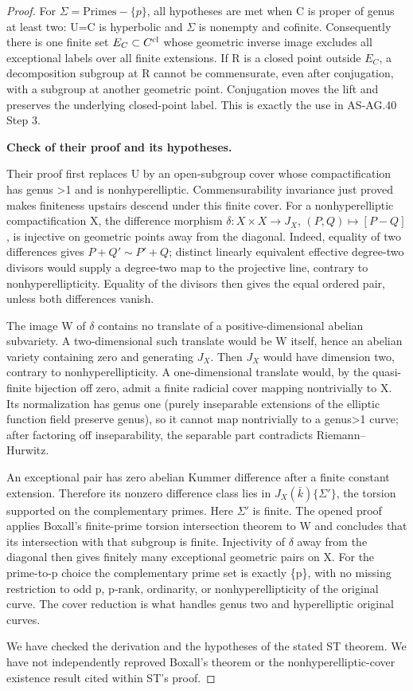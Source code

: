 \begin{proof}
For \({\Sigma}=\mathrm{Primes}-\{p\}\), all hypotheses are met when C is proper of genus at least two: U=C is hyperbolic and \({\Sigma}\) is nonempty and cofinite. Consequently there is one finite set \(E_C\subset C^{\rm cl}\) whose geometric inverse image excludes all exceptional labels over all finite extensions. If R is a closed point outside \(E_C\), a decomposition subgroup at R cannot be commensurate, even after conjugation, with a subgroup at another geometric point. Conjugation moves the lift and preserves the underlying closed-point label. This is exactly the use in AS-AG.40 Step 3.

\textbf{Check of their proof and its hypotheses.}

Their proof first replaces U by an open-subgroup cover whose compactification has genus \textgreater1 and is nonhyperelliptic. Commensurability invariance just proved makes finiteness upstairs descend under this finite cover. For a nonhyperelliptic compactification X, the difference morphism \(\delta:X\times X\to J_X\), \((P,Q)\mapsto[P-Q]\), is injective on geometric points away from the diagonal. Indeed, equality of two differences gives \(P+Q'\sim P'+Q\); distinct linearly equivalent effective degree-two divisors would supply a degree-two map to the projective line, contrary to nonhyperellipticity. Equality of the divisors then gives the equal ordered pair, unless both differences vanish.

The image W of \({\delta}\) contains no translate of a positive-dimensional abelian subvariety. A two-dimensional such translate would be W itself, hence an abelian variety containing zero and generating \(J_X\). Then \(J_X\) would have dimension two, contrary to nonhyperellipticity. A one-dimensional translate would, by the quasi-finite bijection off zero, admit a finite radicial cover mapping nontrivially to X. Its normalization has genus one (purely inseparable extensions of the elliptic function field preserve genus), so it cannot map nontrivially to a genus\textgreater1 curve; after factoring off inseparability, the separable part contradicts Riemann--Hurwitz.

An exceptional pair has zero abelian Kummer difference after a finite constant extension. Therefore its nonzero difference class lies in \(J_X(\bar k)\{\Sigma'\}\), the torsion supported on the complementary primes. Here \({\Sigma}'\) is finite. The opened proof applies Boxall's finite-prime torsion intersection theorem to W and concludes that its intersection with that subgroup is finite. Injectivity of \({\delta}\) away from the diagonal then gives finitely many exceptional geometric pairs on X. For the prime-to-p choice the complementary prime set is exactly \{p\}, with no missing restriction to odd p, p-rank, ordinarity, or nonhyperellipticity of the original curve. The cover reduction is what handles genus two and hyperelliptic original curves.

We have checked the derivation and the hypotheses of the stated ST theorem. We have not independently reproved Boxall's theorem or the nonhyperelliptic-cover existence result cited within ST's proof.


\end{proof}

